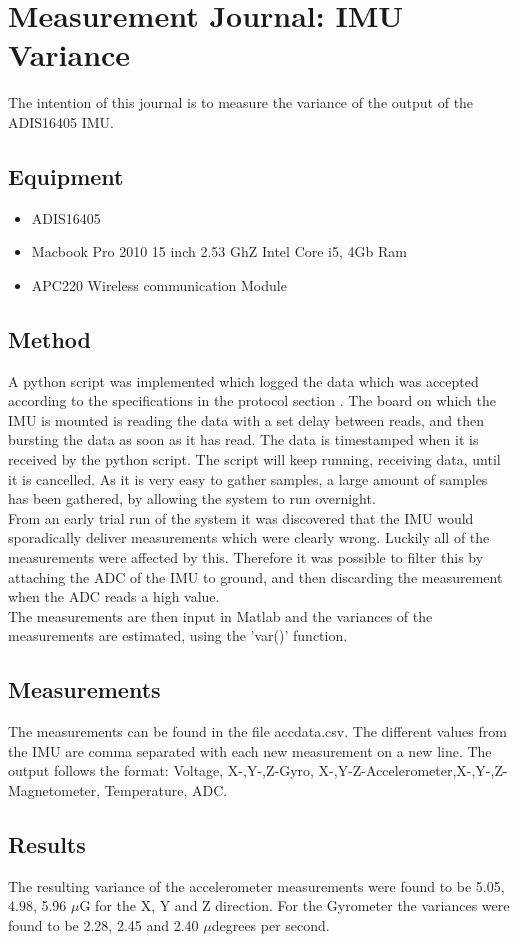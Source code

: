 \chapter{Measurement Journal: IMU Variance}
The intention of this journal is to measure the variance of the output of the ADIS16405 IMU.
\section{Equipment}
\begin{itemize}
\item ADIS16405
\item Macbook Pro 2010 15 inch 2.53 GhZ Intel Core i5, 4Gb Ram
\item APC220 Wireless communication Module
\end{itemize}

\section{Method}
A python script was implemented which logged the data which was accepted according to the specifications in the protocol section . The board on which the IMU is mounted is reading the data with a set delay between reads, and then bursting the data as soon as it has read. The data is timestamped when it is received by the python script. The script will keep running, receiving data, until it is cancelled. As it is very easy to gather samples, a large amount of samples has been gathered, by allowing the system to run overnight.\\
From an early trial run of the system it was discovered that the IMU would sporadically deliver measurements which were clearly wrong. Luckily all of the measurements were affected by this. Therefore it was possible to filter this by attaching the ADC of the IMU to ground, and then discarding the measurement when the ADC reads a high value.\\
The measurements are then input in Matlab and the variances of the measurements are estimated, using the 'var()' function.
\section{Measurements}
The measurements can be found in the file accdata.csv. The different values from the IMU are comma separated with each new measurement on a new line. The output follows the format: Voltage, X-,Y-,Z-Gyro, X-,Y-Z-Accelerometer,X-,Y-,Z-Magnetometer, Temperature, ADC.
\section{Results}
The resulting variance of the accelerometer measurements were found to be 5.05, 4.98, 5.96 $\mu$G for the X, Y and Z direction. 
For the Gyrometer the variances were found to be 2.28, 2.45 and 2.40 $\mu$degrees per second.